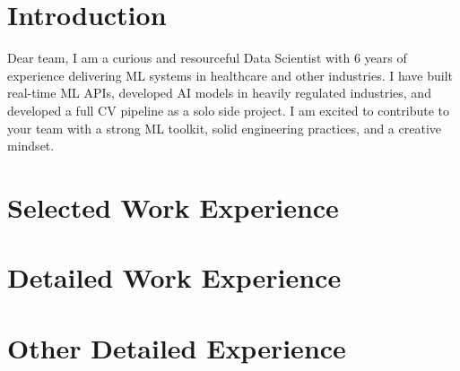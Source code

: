 \documentclass[11pt,a4paper]{moderncv}
\begin{document}
\makecvtitle

\section*{Introduction}
Dear \company{} team, I am a curious and resourceful Data Scientist with 6 years of experience delivering ML systems in healthcare and other industries. I have built real-time ML APIs, developed AI models in heavily regulated industries, and developed a full CV pipeline as a solo side project. I am excited to contribute to your team with a strong ML toolkit, solid engineering practices, and a creative mindset.

\section{Selected Work Experience}







\newpage
\section{Detailed Work Experience}





\section{Other Detailed Experience}

\end{document}
